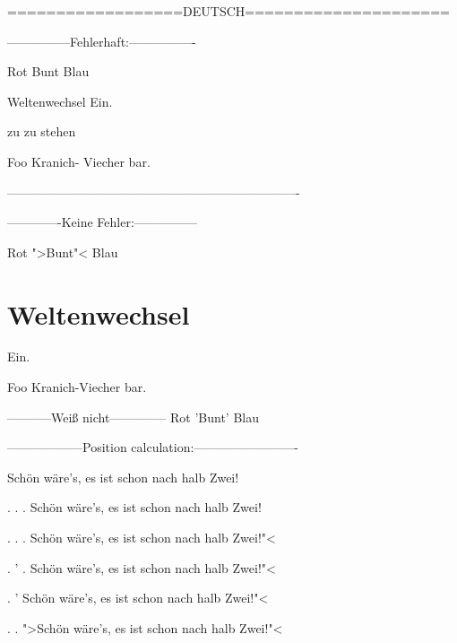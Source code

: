 
==================DEUTSCH=====================

---------------Fehlerhaft:----------------



Rot Bunt Blau


Weltenwechsel Ein.


zu zu stehen


Foo Kranich- Viecher bar. 

----------------------------------------------------------------------

-------------Keine Fehler:---------------



Rot ">Bunt"< Blau





\chapter{Weltenwechsel}
Ein.





Foo Kranich-Viecher bar. 



-----------Weiß nicht--------------
Rot 'Bunt' Blau

------------------Position calculation:-------------------------

Schön wäre's, es ist schon nach halb Zwei!

. . . Schön wäre's, es ist schon nach halb Zwei! 

. . . Schön wäre's, es ist schon nach halb Zwei!"< 

. ' . Schön wäre's, es ist schon nach halb Zwei!"< 

. ' Schön wäre's, es ist schon nach halb Zwei!"< 

. . ">Schön wäre's, es ist schon nach halb Zwei!"< 


